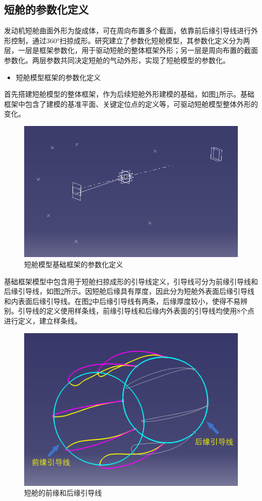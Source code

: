 \documentclass[12pt,a4paper]{report}
\begin{document}
\subsection{短舱的参数化定义}

发动机短舱曲面外形为旋成体，可在周向布置多个截面，依靠前后缘引导线进行外形控制，通过360°扫掠成形。研究建立了参数化短舱模型，其参数化定义分为两层，一层是框架参数化，用于驱动短舱的整体框架外形；另一层是周向布置的截面参数化。两层参数共同决定短舱的气动外形，实现了短舱模型的参数化。

\begin{itemize}
    \item[(1)] 短舱模型框架的参数化定义
\end{itemize}

首先搭建短舱模型的整体框架，作为后续短舱外形建模的基础，如图\ref{fig:NacelleFramework}所示。基础框架中包含了建模的基准平面、关键定位点的定义等，可驱动短舱模型整体外形的变化。

\begin{figure}[hbt!]
\centering
\includegraphics[width=.8\textwidth]{NacelleFramework.PNG}
\caption{短舱模型基础框架的参数化定义}
\label{fig:NacelleFramework}
\end{figure}

基础框架模型中包含用于短舱扫掠成形的引导线定义，引导线可分为前缘引导线和后缘引导线，如图\ref{fig:NacelleGuideLines}所示。因短舱后缘具有厚度，因此分为短舱外表面后缘引导线和内表面后缘引导线。在图\ref{fig:NacelleGuideLines}中后缘引导线有两条，后缘厚度较小，使得不易辨别。引导线的定义使用样条线，前缘引导线和后缘内外表面的引导线均使用8个点进行定义，建立样条线。

\begin{figure}[hbt!]
\centering
\includegraphics[width=.8\textwidth]{NacelleGuideLines.PNG}
\caption{短舱的前缘和后缘引导线}
\label{fig:NacelleGuideLines}
\end{figure}
\end{document}
